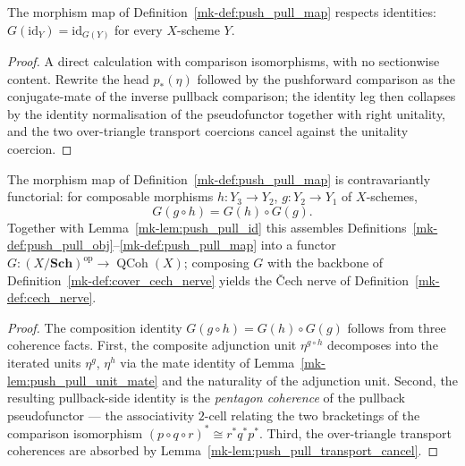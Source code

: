 \begin{lemma}\label{mk-lem:push_pull_id}
  \leanok

  The morphism map of Definition~\ref{mk-def:push_pull_map} respects identities:
  \(G(\mathrm{id}_Y) = \mathrm{id}_{G(Y)}\) for every \(X\)-scheme \(Y\).
\end{lemma}

\begin{proof}

  A direct calculation with comparison isomorphisms, with no sectionwise content.
  Rewrite the head \(p_*(\eta)\) followed by the pushforward comparison as the
  conjugate-mate of the inverse pullback comparison; the identity leg then collapses
  by the identity normalisation of the pseudofunctor together with right unitality,
  and the two over-triangle transport coercions cancel against the unitality coercion.
\end{proof}

\begin{lemma}
  \label{mk-lem:push_pull_comp}

  The morphism map of Definition~\ref{mk-def:push_pull_map} is contravariantly functorial:
  for composable morphisms \(h : Y_3 \to Y_2\), \(g : Y_2 \to Y_1\) of \(X\)-schemes,
  \[
    G(g \circ h) = G(h) \circ G(g).
  \]
  Together with Lemma~\ref{mk-lem:push_pull_id} this assembles
  Definitions~\ref{mk-def:push_pull_obj}--\ref{mk-def:push_pull_map} into a functor
  \(G : (X/\mathbf{Sch})^{\mathrm{op}} \to \operatorname{QCoh}(X)\); composing \(G\) with
  the backbone of Definition~\ref{mk-def:cover_cech_nerve} yields the {\v C}ech nerve of
  Definition~\ref{mk-def:cech_nerve}.
\end{lemma}

\begin{proof}
  The composition identity \(G(g \circ h) = G(h) \circ G(g)\) follows from three
  coherence facts. First, the composite adjunction unit \(\eta^{g \circ h}\) decomposes into
  the iterated units \(\eta^{g}\), \(\eta^{h}\) via the mate identity of
  Lemma~\ref{mk-lem:push_pull_unit_mate} and the naturality of the adjunction unit. Second,
  the resulting pullback-side identity is the \emph{pentagon coherence} of the pullback
  pseudofunctor — the associativity \(2\)-cell relating the two bracketings of the comparison
  isomorphism \((p \circ q \circ r)^* \cong r^* q^* p^*\). Third, the over-triangle transport
  coherences are absorbed by Lemma~\ref{mk-lem:push_pull_transport_cancel}.
\end{proof}

